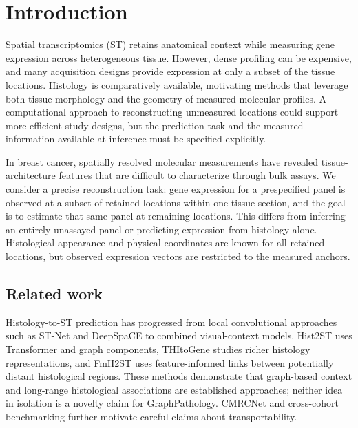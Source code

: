 \section{Introduction}
Spatial transcriptomics (ST) retains anatomical context while measuring gene expression across heterogeneous tissue\cite{stahl2016}. However, dense profiling can be expensive, and many acquisition designs provide expression at only a subset of the tissue locations. Histology is comparatively available, motivating methods that leverage both tissue morphology and the geometry of measured molecular profiles\cite{jaume2024,he2020}. A computational approach to reconstructing unmeasured locations could support more efficient study designs, but the prediction task and the measured information available at inference must be specified explicitly.

In breast cancer, spatially resolved molecular measurements have revealed tissue-architecture features that are difficult to characterize through bulk assays\cite{andersson2021,wu2021,bassiouni2023}. We consider a precise reconstruction task: gene expression for a prespecified panel is observed at a subset of retained locations within one tissue section, and the goal is to estimate that same panel at remaining locations. This differs from inferring an entirely unassayed panel or predicting expression from histology alone. Histological appearance and physical coordinates are known for all retained locations, but observed expression vectors are restricted to the measured anchors.

\subsection{Related work}
Histology-to-ST prediction has progressed from local convolutional approaches such as ST-Net\cite{he2020} and DeepSpaCE\cite{monjo2022} to combined visual-context models. Hist2ST uses Transformer and graph components\cite{hist2st2022}, THItoGene studies richer histology representations\cite{thitogene2024}, and FmH2ST uses feature-informed links between potentially distant histological regions\cite{fmh2st2025}. These methods demonstrate that graph-based context and long-range histological associations are established approaches; neither idea in isolation is a novelty claim for GraphPathology. CMRCNet\cite{liu2026} and cross-cohort benchmarking\cite{wang2025} further motivate careful claims about transportability.

